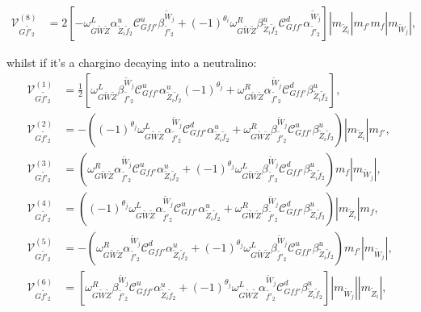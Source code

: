 \documentclass[final,3p,times,pdflatex]{elsarticle}
\begin{document}
\begin{align}
\mathcal{V}_{G \tilde{f'}_2}^{(8)} &= 2[-\omega_{G \tilde{W} \tilde{Z}}^L \alpha_{\tilde{Z}_i \tilde{f}_2}^{u} \mathcal{C}_{G f f'}^u \beta_{\tilde{f'}_2}^{\tilde{W}_j} + (-1)^{\theta_i} \omega_{G \tilde{W} \tilde{Z}}^R \beta_{\tilde{Z}_i \tilde{f}_2}^{u} \mathcal{C}_{G f f'}^d \alpha_{\tilde{f'}_2}^{\tilde{W}_j}]|m_{\tilde{Z}_i}|m_{f'}m_{f}|m_{\tilde{W}_j}|,
\end{align}

whilst if it's a chargino decaying into a neutralino:
\begin{align}
\mathcal{V}_{G \tilde{f'}_2}^{(1)} &= \frac{1}{2}[\omega_{G \tilde{W} \tilde{Z}}^L \beta_{\tilde{f'}_2}^{\tilde{W}_j} \mathcal{C}_{G f f'}^u \alpha_{\tilde{Z}_i \tilde{f}_2}^{u} (-1)^{\theta_j} + \omega_{G \tilde{W} \tilde{Z}}^R \alpha_{\tilde{f'}_2}^{\tilde{W}_j} \mathcal{C}_{G f f'}^d \beta_{\tilde{Z}_i \tilde{f}_2}^{u} ], \\
\mathcal{V}_{G \tilde{f'}_2}^{(2)} &= -((-1)^{\theta_j}\omega_{G \tilde{W} \tilde{Z}}^L \alpha_{\tilde{f'}_2}^{\tilde{W}_j} \mathcal{C}_{G f f'}^d \alpha_{\tilde{Z}_i \tilde{f}_2}^{u} +  \omega_{G \tilde{W} \tilde{Z}}^R \beta_{\tilde{f'}_2}^{\tilde{W}_j} \mathcal{C}_{G f f'}^u \beta_{\tilde{Z}_i \tilde{f}_2}^{u})|m_{\tilde{Z}_i}|m_{f'}, \\
\mathcal{V}_{G \tilde{f'}_2}^{(3)} &= (\omega_{G \tilde{W} \tilde{Z}}^R \alpha_{\tilde{f'}_2}^{\tilde{W}_j} \mathcal{C}_{G f f'}^u \alpha_{\tilde{Z}_i \tilde{f}_2}^{u} + (-1)^{\theta_j}\omega_{G \tilde{W} \tilde{Z}}^L \beta_{\tilde{f'}_2}^{\tilde{W}_j} \mathcal{C}_{G f f'}^d \beta_{\tilde{Z}_i \tilde{f}_2}^{u})m_{f}|m_{\tilde{W}_j}| ,\\
\mathcal{V}_{G \tilde{f'}_2}^{(4)} &= ((-1)^{\theta_j}\omega_{G \tilde{W} \tilde{Z}}^L \alpha_{\tilde{f'}_2}^{\tilde{W}_j} \mathcal{C}_{G f f'}^u \alpha_{\tilde{Z}_i \tilde{f}_2}^{u} + \omega_{G \tilde{W} \tilde{Z}}^R \beta_{\tilde{f'}_2}^{\tilde{W}_j} \mathcal{C}_{G f f'}^d \beta_{\tilde{Z}_i \tilde{f}_2}^{u} ) |m_{\tilde{Z}_i}| m_{f}, \\
\mathcal{V}_{G \tilde{f'}_2}^{(5)} &= -(\omega_{G \tilde{W} \tilde{Z}}^R \alpha_{\tilde{f'}_2}^{\tilde{W}_j} \mathcal{C}_{G f f'}^d \alpha_{\tilde{Z}_i \tilde{f}_2}^{u} + (-1)^{\theta_j} \omega_{G \tilde{W} \tilde{Z}}^L \beta_{\tilde{f'}_2}^{\tilde{W}_j} \mathcal{C}_{G f f'}^u \beta_{\tilde{Z}_i \tilde{f}_2}^{u})m_{f'}|m_{\tilde{W}_j}|, \\
\mathcal{V}_{G \tilde{f'}_2}^{(6)} &= [\omega_{G \tilde{W} \tilde{Z}}^R \beta_{\tilde{f'}_2}^{\tilde{W}_j} \mathcal{C}_{G f f'}^u \alpha_{\tilde{Z}_i \tilde{f}_2}^{u} + (-1)^{\theta_j}\omega_{G \tilde{W} \tilde{Z}}^L \alpha_{\tilde{f'}_2}^{\tilde{W}_j} \mathcal{C}_{G f f'}^d \beta_{\tilde{Z}_i \tilde{f}_2}^{u}]|m_{\tilde{W}_j}||m_{\tilde{Z}_i}|, \\

\end{align}
\end{document}
